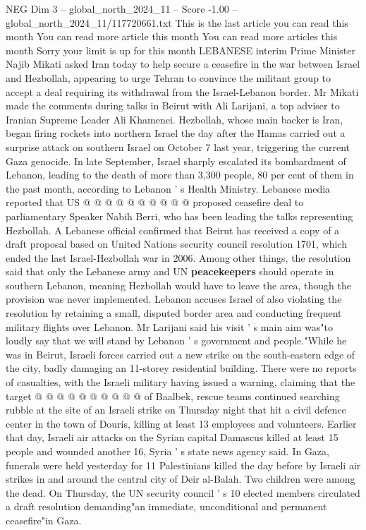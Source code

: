 \begin{textsample}{NEG Dim 3 – global\_north\_2024\_11 – Score -1.00 – global\_north\_2024\_11/117720661.txt}  \label{ex:f3_neg_289}
This is the last article you can read this month You can read more article this month You can read more articles this month Sorry your limit is up for this month LEBANESE interim Prime Minister Najib Mikati asked Iran today to help secure a ceasefire in the war between Israel and Hezbollah, appearing to urge Tehran to convince the militant group to accept a deal requiring its withdrawal from the Israel-Lebanon border.
Mr Mikati made the comments during talks in Beirut with Ali Larijani, a top adviser to Iranian Supreme Leader Ali Khamenei.
Hezbollah, whose main backer is Iran, began firing rockets into northern Israel the day after the Hamas carried out a surprise attack on southern Israel on October 7 last year, triggering the current Gaza genocide.
In late September, Israel sharply escalated its bombardment of Lebanon, leading to the death of more than 3,300 people, 80 per cent of them in the past month, according to Lebanon ' s Health Ministry.
Lebanese media reported that US @ @ @ @ @ @ @ @ @ @ proposed ceasefire deal to parliamentary Speaker Nabih Berri, who has been leading the talks representing Hezbollah.
A Lebanese official confirmed that Beirut has received a copy of a draft proposal based on United Nations security council resolution 1701, which ended the last Israel-Hezbollah war in 2006.
Among other things, the resolution said that only the Lebanese army and UN \textbf{peacekeepers} should operate in southern Lebanon, meaning Hezbollah would have to leave the area, though the provision was never implemented.
Lebanon accuses Israel of also violating the resolution by retaining a small, disputed border area and conducting frequent military flights over Lebanon.
Mr Larijani said his visit ' s main aim was"to loudly say that we will stand by Lebanon ' s government and people."While he was in Beirut, Israeli forces carried out a new strike on the south-eastern edge of the city, badly damaging an 11-storey residential building.
There were no reports of casualties, with the Israeli military having issued a warning, claiming that the target @ @ @ @ @ @ @ @ @ @ of Baalbek, rescue teams continued searching rubble at the site of an Israeli strike on Thursday night that hit a civil defence center in the town of Douris, killing at least 13 employees and volunteers.
Earlier that day, Israeli air attacks on the Syrian capital Damascus killed at least 15 people and wounded another 16, Syria ' s state news agency said.
In Gaza, funerals were held yesterday for 11 Palestinians killed the day before by Israeli air strikes in and around the central city of Deir al-Balah.
Two children were among the dead.
On Thursday, the UN security council ' s 10 elected members circulated a draft resolution demanding"an immediate, unconditional and permanent ceasefire"in Gaza.

\end{textsample}
